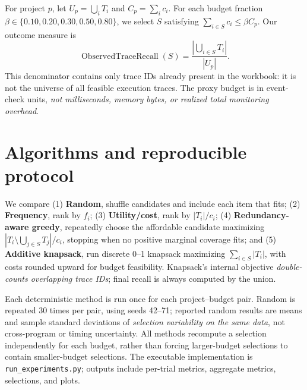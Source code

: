 \documentclass[10pt,letterpaper]{article}
\begin{document}
For project $p$, let $U_p=\bigcup_i T_i$ and $C_p=\sum_i c_i$. For each budget fraction $\beta\in\{0.10,0.20,0.30,0.50,0.80\}$, we select $S$ satisfying $\sum_{i\in S}c_i\leq\beta C_p$. Our outcome measure is
\[
\operatorname{ObservedTraceRecall}(S)=\frac{\left|\bigcup_{i\in S}T_i\right|}{|U_p|}.
\]
This denominator contains only trace IDs already present in the workbook: it is not the universe of all feasible execution traces. The proxy budget is in event-check units, \emph{not milliseconds, memory bytes, or realized total monitoring overhead}.
\section{Algorithms and reproducible protocol}
We compare (1) \textbf{Random}, shuffle candidates and include each item that fits; (2) \textbf{Frequency}, rank by $f_i$; (3) \textbf{Utility/cost}, rank by $|T_i|/c_i$; (4) \textbf{Redundancy-aware greedy}, repeatedly choose the affordable candidate maximizing $|T_i\setminus\bigcup_{j\in S}T_j|/c_i$, stopping when no positive marginal coverage fits; and (5) \textbf{Additive knapsack}, run discrete 0--1 knapsack maximizing $\sum_{i\in S}|T_i|$, with costs rounded upward for budget feasibility. Knapsack's internal objective \emph{double-counts overlapping trace IDs}; final recall is always computed by the union.

Each deterministic method is run once for each project--budget pair. Random is repeated 30 times per pair, using seeds 42--71; reported random results are means and sample standard deviations of \emph{selection variability on the same data}, not cross-program or timing uncertainty. All methods recompute a selection independently for each budget, rather than forcing larger-budget selections to contain smaller-budget selections. The executable implementation is \texttt{run\_experiments.py}; outputs include per-trial metrics, aggregate metrics, selections, and plots.
\end{document}
